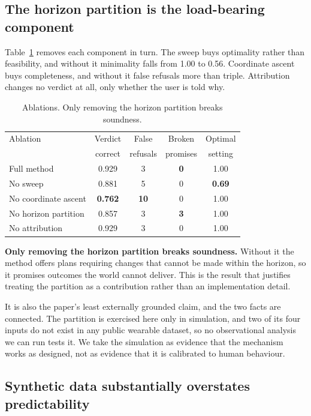 \documentclass[conference]{IEEEtran}
\begin{document}
\subsection{The horizon partition is the load-bearing component}
\label{sec:ablation}

Table~\ref{tab:ablation} removes each component in turn. The sweep buys
optimality rather than feasibility, and without it minimality falls from 1.00 to
0.56. Coordinate ascent buys completeness, and without it false refusals more
than triple. Attribution changes no verdict at all, only whether the user is
told why.

\begin{table}[t]
\caption{Ablations. Only removing the horizon partition breaks soundness.}
\label{tab:ablation}
\centering
\small
\begin{tabular}{lcccc}
\toprule
Ablation & Verdict & False & Broken & Optimal \\
 & correct & refusals & promises & setting \\
\midrule
Full method & 0.929 & 3 & \textbf{0} & 1.00 \\
No sweep & 0.881 & 5 & 0 & \textbf{0.69} \\
No coordinate ascent & \textbf{0.762} & \textbf{10} & 0 & 1.00 \\
No horizon partition & 0.857 & 3 & \textbf{3} & 1.00 \\
No attribution & 0.929 & 3 & 0 & 1.00 \\
\bottomrule
\end{tabular}
\end{table}

\textbf{Only removing the horizon partition breaks soundness.} Without it the
method offers plans requiring changes that cannot be made within the horizon, so
it promises outcomes the world cannot deliver. This is the result that justifies
treating the partition as a contribution rather than an implementation detail.

It is also the paper's least externally grounded claim, and the two facts are
connected. The partition is exercised here only in simulation, and two of its
four inputs do not exist in any public wearable dataset, so no observational
analysis we can run tests it. We take the simulation as evidence that the
mechanism works as designed, not as evidence that it is calibrated to human
behaviour.

\subsection{Synthetic data substantially overstates predictability}
\end{document}
